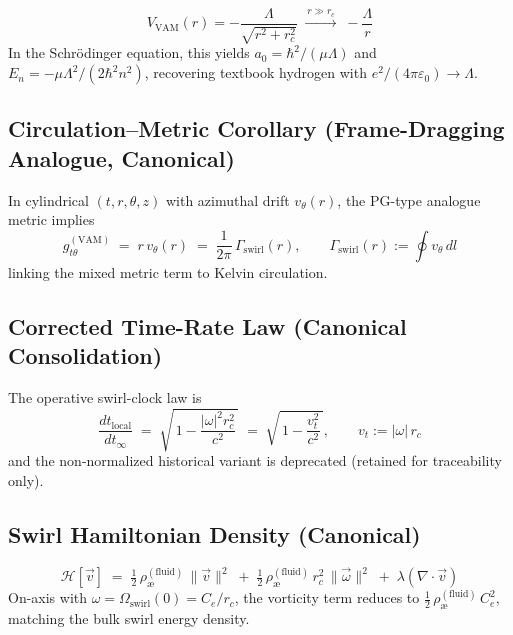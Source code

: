 \documentclass[11pt, a4paper]{article}
\begin{document}
\begin{theorem}
    \[
        \boxed{\, V_{\text{VAM}}(r) = -\frac{\Lambda}{\sqrt{r^2+r_c^2}}
        \;\xrightarrow{\,r\gg r_c\,}\; -\frac{\Lambda}{r} \,}
    \]
    In the Schr\"odinger equation, this yields
    $a_0=\hbar^2/(\mu\Lambda)$ and $E_n=-\mu\Lambda^2/(2\hbar^2 n^2)$,
    recovering textbook hydrogen with $e^2/(4\pi\varepsilon_0)\to\Lambda$.
    \cite{Schrodinger1926,Jackson1999}
\end{theorem}

\subsection{Circulation–Metric Corollary (Frame-Dragging Analogue, Canonical)}
\label{subsec:canon-metric-circulation}
In cylindrical $(t,r,\theta,z)$ with azimuthal drift $v_\theta(r)$, the PG-type analogue metric implies
\[
    \boxed{\, g^{(\mathrm{VAM})}_{t\theta} \;=\; r\,v_\theta(r) \;=\; \frac{1}{2\pi}\,\Gamma_{\text{swirl}}(r),\qquad
    \Gamma_{\text{swirl}}(r):=\oint v_\theta\,dl \,}
\]
linking the mixed metric term to Kelvin circulation. \cite{Painleve1921,Gullstrand1922,Unruh1981,Visser1998,Kerr1963}

\subsection{Corrected Time-Rate Law (Canonical Consolidation)}
\label{subsec:canon-time-rate}
The operative swirl-clock law is
\[
    \boxed{\, \frac{dt_{\text{local}}}{dt_\infty} \;=\; \sqrt{\,1-\frac{|\omega|^2 r_c^2}{c^2}\,}
    \;=\; \sqrt{\,1-\frac{v_t^2}{c^2}\,},\qquad v_t:=|\omega|\,r_c \,}
\]
and the non-normalized historical variant is deprecated (retained for traceability only).

\subsection{Swirl Hamiltonian Density (Canonical)}
\label{subsec:canon-hamiltonian}
\[
    \boxed{\, \mathcal{H}[\vec v] \;=\; \tfrac12\,\rho_{\text{\ae}}^{(\text{fluid})}\,\|\vec v\|^2
    \;+\; \tfrac12\,\rho_{\text{\ae}}^{(\text{fluid})}\,r_c^2\,\|\vec\omega\|^2
    \;+\; \lambda(\nabla\!\cdot\!\vec v) \,}
\]
On-axis with $\omega=\Omega_{\text{swirl}}(0)=C_e/r_c$, the vorticity term reduces to
$\tfrac12\,\rho_{\text{\ae}}^{(\text{fluid})}\,C_e^2$, matching the bulk swirl energy density. \cite{Batchelor1967,LandauLifshitz1987}
\end{document}
